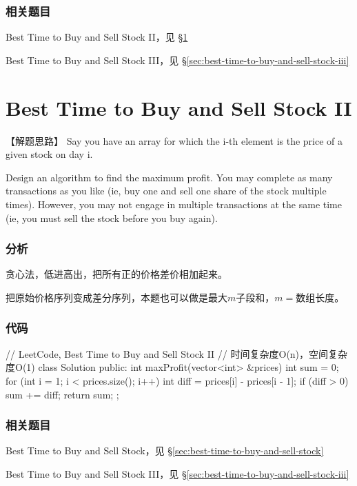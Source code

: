 \subsubsection{相关题目}
\begindot
\item Best Time to Buy and Sell Stock II，见 \S \ref{sec:best-time-to-buy-and-sell-stock-ii}
\item Best Time to Buy and Sell Stock III，见 \S \ref{sec:best-time-to-buy-and-sell-stock-iii}
\myenddot


\section{Best Time to Buy and Sell Stock II} %
\label{sec:best-time-to-buy-and-sell-stock-ii}


【解题思路】
Say you have an array for which the i-th element is the price of a given stock on day i.

Design an algorithm to find the maximum profit. You may complete as many transactions as you like (ie, buy one and sell one share of the stock multiple times). However, you may 
not engage in multiple transactions at the same time (ie, you must sell the stock before you buy again).


\subsubsection{分析}
贪心法，低进高出，把所有正的价格差价相加起来。

把原始价格序列变成差分序列，本题也可以做是最大$m$子段和，$m=$数组长度。

\subsubsection{代码}
\begin{Code}
	// LeetCode, Best Time to Buy and Sell Stock II
	// 时间复杂度O(n)，空间复杂度O(1)
	class Solution {
		public:
		int maxProfit(vector<int> &prices) {
			int sum = 0;
			for (int i = 1; i < prices.size(); i++) {
				int diff = prices[i] - prices[i - 1];
				if (diff > 0) sum += diff;
			}
			return sum;
		}
	};
\end{Code}


\subsubsection{相关题目}
\begindot
\item Best Time to Buy and Sell Stock，见 \S \ref{sec:best-time-to-buy-and-sell-stock}
\item Best Time to Buy and Sell Stock III，见 \S \ref{sec:best-time-to-buy-and-sell-stock-iii}
\myenddot


